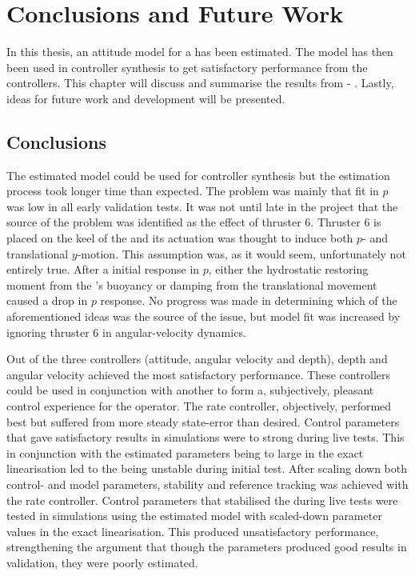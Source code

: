 \chapter{Conclusions and Future Work}\label{cha:conclusions}
In this thesis, an attitude model for a \abbrROV has been estimated. The model has then been used in controller synthesis to get satisfactory performance from the controllers. This chapter will discuss and summarise the results from  - . 
Lastly, ideas for future work and development will be presented.

\section{Conclusions}
The estimated model could be used for controller synthesis but the estimation process took longer time than expected. The problem was mainly that fit in $p$ was low in all early validation tests. It was not until late in the project that the source of the problem was identified as the effect of thruster 6. Thruster 6 is  placed on the keel of the \abbrROV and its actuation was thought to induce both $p$- and translational $y$-motion. This assumption was, as it would seem, unfortunately not entirely true. After a initial response in $p$, either the hydrostatic restoring moment from the \abbrROV's buoyancy or damping from the translational movement caused a drop in $p$ response. No progress was made in determining which of the aforementioned ideas was the source of the issue, but model fit was increased by ignoring thruster 6 in angular-velocity dynamics.  

Out of the three controllers (attitude, angular velocity and depth), depth and angular velocity achieved the most satisfactory performance. These controllers could be used in conjunction with another to form a, subjectively, pleasant control experience for the operator. The rate controller, objectively, performed best but suffered from more steady state-error than desired. Control parameters that gave satisfactory results in simulations were to strong during live tests. This in conjunction with the estimated parameters being to large in the exact linearisation led to the \abbrROV being unstable during initial test. After scaling down both control- and model parameters, stability and reference tracking was achieved with the rate controller. Control parameters that stabilised the \abbrROV during live tests were tested in simulations using the estimated model with scaled-down parameter values in the exact linearisation. This produced unsatisfactory performance, strengthening the argument that though the parameters produced good results in validation, they were poorly estimated.

